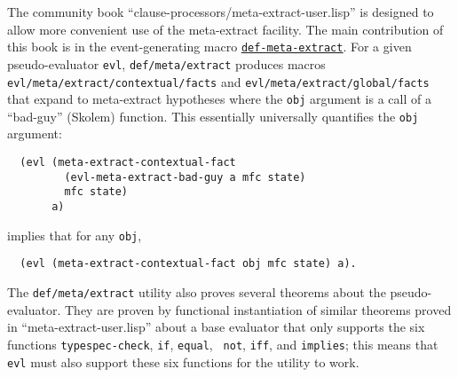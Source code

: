 The community book ``clause-processors/meta-extract-user.lisp'' is
designed to allow more convenient use of the meta-extract facility.
The main contribution of this book is in the event-generating macro
\href{http://www.cs.utexas.edu/users/moore/acl2/manuals/current/manual/index.html?topic=ACL2\_\_\_\_DEF-META-EXTRACT}{\underline{\tt def-meta-extract}}. For a given pseudo-evaluator \texttt{evl},
\texttt{def\-/meta\-/extract} produces macros
\texttt{evl\-/meta\-/extract\-/contextual\-/facts} and
\texttt{evl\-/meta\-/extract\-/global\-/facts} that expand to meta-extract
hypotheses where the \texttt{obj} argument is a call of a ``bad-guy'' (Skolem)
function.  This essentially universally quantifies the \texttt{obj}
argument:
\begin{verbatim}
  (evl (meta-extract-contextual-fact
         (evl-meta-extract-bad-guy a mfc state)
         mfc state)
       a)
\end{verbatim}
implies that for any \texttt{obj},
\begin{verbatim}
  (evl (meta-extract-contextual-fact obj mfc state) a).
\end{verbatim}

The \texttt{def\-/meta\-/extract} utility also proves several theorems
about the pseudo-evaluator.  They are proven by
functional instantiation of similar theorems proved in
``meta-extract-user.lisp'' about a base evaluator that only supports
the six functions {\tt typespec-check}, {\tt if}, {\tt equal}, {\tt
  not}, {\tt iff}, and {\tt implies}; this means that {\tt evl} must
also support these six functions for the utility to work.


